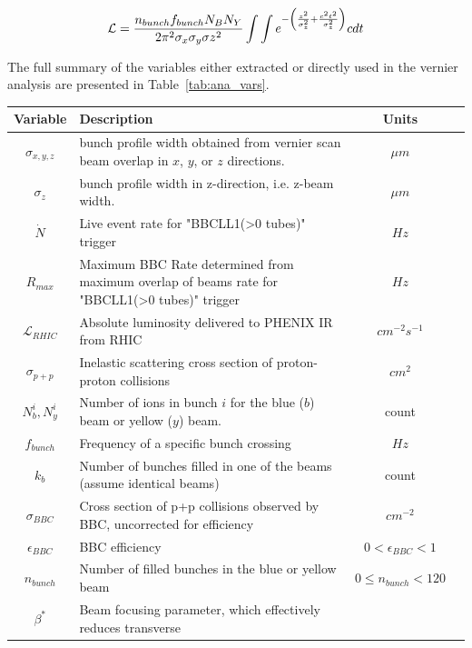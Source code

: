\begin{equation}
\label{eq:reletivistic_beam_final} 
\mathcal{L} = {{n_{bunch} f_{bunch} N_{B} N_{Y} }\over{ 2 \pi^{2} \sigma_{x}
\sigma_{y}\sigma{z}^2}} \int \int
e^{-\left({{z^{2}}\over{\sigma_{z}^{2}}}+{{c^{2}t^{2}}\over{\sigma_{z}^{2}}}\right)} c dt
\end{equation}

{\noindent}The full summary of the variables either extracted or directly used
in the vernier analysis are presented in Table~\ref{tab:ana_vars}.

\begin{table}[ht]
  \centering
  \begin{tabular}{c p{9cm} c c }
    \toprule
    \textbf{Variable} & \textbf{Description} & \textbf{Units}  \\
    \midrule 
    $\sigma_{x,y,z} $ & bunch profile width obtained from vernier scan beam
    overlap in $x$, $y$, or $z$ directions. & $\mu m$  \\
    $\sigma_{z}$ & bunch profile width in z-direction, i.e. z-beam width. & $\mu
    m$ \\
    $\dot{N}$ & Live event rate for "BBCLL1(\textgreater0 tubes)" trigger & $Hz$
    \\
    $R_{max}$ & Maximum BBC Rate determined from maximum overlap of beams rate
    for "BBCLL1(\textgreater0 tubes)" trigger & $Hz$ \\
    $\mathcal{L}_{RHIC}$ & Absolute luminosity delivered to PHENIX IR from RHIC
    & $cm^{-2}s^{-1}$ \\
    $\sigma_{p+p} $ & Inelastic scattering cross section of proton-proton
    collisions & $cm^{2}$ \\
    $N_{b}^{i},N_{y}^{i}$ & Number of ions in bunch $i$ for the blue ($b$) beam
    or yellow ($y$) beam. & count \\
    $f_{bunch}$ & Frequency of a specific bunch crossing & $Hz$ \\
    $k_{b}$ & Number of bunches filled in one of the beams (assume identical
    beams) & count \\
    $\sigma_{BBC}$ & Cross section of p+p collisions observed by BBC,
    uncorrected for efficiency & $cm^{-2}$ \\
    $\epsilon_{BBC}$ & BBC efficiency & $0 < \epsilon_{BBC} < 1 $ \\
    $n_{bunch}$ & Number of filled bunches in the blue or yellow beam & $0 \leq
    n_{bunch} < 120$ \\
    $\beta^*$ & Beam focusing parameter, which effectively reduces transverse

\end{tabular}
\end{table}
